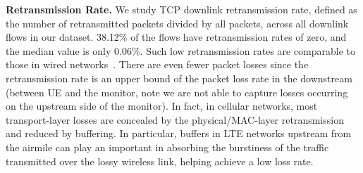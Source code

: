 \textbf{Retransmission Rate.} We study TCP downlink retransmission rate, defined as the number of retransmitted packets divided by all packets, across all downlink flows in our dataset. 38.12\% of the flows have retransmission rates of zero, and the median value is only 0.06\%. Such low retransmission rates are comparable to those in wired networks~\cite{qian09}. There are even fewer packet losses since the retransmission rate is an upper bound of the packet loss rate in the downstream (\ie between UE and the monitor, note we are not able to capture losses occurring on the upstream side of the monitor). In fact, in cellular networks, most transport-layer losses are concealed by the physical/MAC-layer retransmission and reduced by buffering.
In particular, buffers in LTE networks upstream from the airmile can play an important in absorbing the burstiness of the
traffic transmitted over the lossy wireless link, helping achieve a low loss rate.



\label{sec:tcp.compare}

